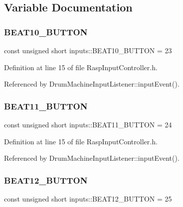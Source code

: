 \subsection{Variable Documentation}
\mbox{\label{namespaceinputs_a9778bcf3a44a9d16ae156bac6d745a24}} 
\subsubsection{\texorpdfstring{B\+E\+A\+T10\+\_\+\+B\+U\+T\+T\+ON}{BEAT10\_BUTTON}}
{\footnotesize\ttfamily const unsigned short inputs\+::\+B\+E\+A\+T10\+\_\+\+B\+U\+T\+T\+ON = 23}



Definition at line 15 of file Rasp\+Input\+Controller.\+h.



Referenced by Drum\+Machine\+Input\+Listener\+::input\+Event().

\mbox{\label{namespaceinputs_ad09e4010a8b08721988599b198645372}} 
\subsubsection{\texorpdfstring{B\+E\+A\+T11\+\_\+\+B\+U\+T\+T\+ON}{BEAT11\_BUTTON}}
{\footnotesize\ttfamily const unsigned short inputs\+::\+B\+E\+A\+T11\+\_\+\+B\+U\+T\+T\+ON = 24}



Definition at line 15 of file Rasp\+Input\+Controller.\+h.



Referenced by Drum\+Machine\+Input\+Listener\+::input\+Event().

\mbox{\label{namespaceinputs_a7b6bb44b9241cac31ff9909c3fc88271}} 
\subsubsection{\texorpdfstring{B\+E\+A\+T12\+\_\+\+B\+U\+T\+T\+ON}{BEAT12\_BUTTON}}
{\footnotesize\ttfamily const unsigned short inputs\+::\+B\+E\+A\+T12\+\_\+\+B\+U\+T\+T\+ON = 25}



